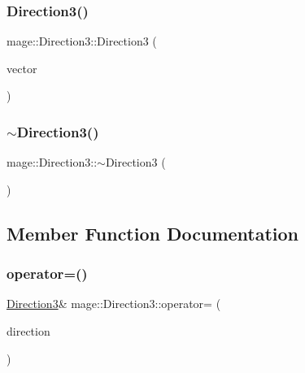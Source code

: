 \hypertarget{structmage_1_1_direction3_aed574d252f60d1832e83a5f996b7dd9f}{}\label{structmage_1_1_direction3_aed574d252f60d1832e83a5f996b7dd9f} 
\subsubsection{\texorpdfstring{Direction3()}{Direction3()}\hspace{0.1cm}{\footnotesize\ttfamily [10/10]}}
{\footnotesize\ttfamily mage\+::\+Direction3\+::\+Direction3 (\begin{DoxyParamCaption}\item[{X\+M\+F\+L\+O\+A\+T3 \&\&}]{vector }\end{DoxyParamCaption})\hspace{0.3cm}{\ttfamily [explicit]}}

\hypertarget{structmage_1_1_direction3_a583c087dc366d206aaf54a33bc90c50b}{}\label{structmage_1_1_direction3_a583c087dc366d206aaf54a33bc90c50b} 
\subsubsection{\texorpdfstring{$\sim$\+Direction3()}{~Direction3()}}
{\footnotesize\ttfamily mage\+::\+Direction3\+::$\sim$\+Direction3 (\begin{DoxyParamCaption}{ }\end{DoxyParamCaption})\hspace{0.3cm}{\ttfamily [default]}}



\subsection{Member Function Documentation}
\hypertarget{structmage_1_1_direction3_a3b3251fcafc37b39bad2c89e5faa09bd}{}\label{structmage_1_1_direction3_a3b3251fcafc37b39bad2c89e5faa09bd} 
\subsubsection{\texorpdfstring{operator=()}{operator=()}\hspace{0.1cm}{\footnotesize\ttfamily [1/2]}}
{\footnotesize\ttfamily \hyperlink{structmage_1_1_direction3}{Direction3}\& mage\+::\+Direction3\+::operator= (\begin{DoxyParamCaption}\item[{const \hyperlink{structmage_1_1_direction3}{Direction3} \&}]{direction }\end{DoxyParamCaption})}

